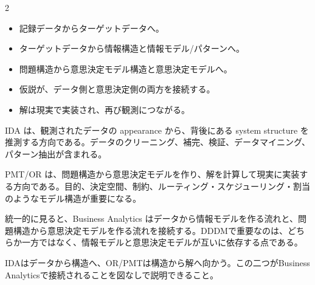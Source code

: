 \begin{multicols}{2}

\footnotesize

\raggedcolumns


\begin{itemize}
\item 記録データからターゲットデータへ。
\item ターゲットデータから情報構造と情報モデル/パターンへ。
\item 問題構造から意思決定モデル構造と意思決定モデルへ。
\item 仮説が、データ側と意思決定側の両方を接続する。
\item 解は現実で実装され、再び観測につながる。
\end{itemize}

IDA は、観測されたデータの appearance から、背後にある system structure を推測する方向である。データのクリーニング、補完、検証、データマイニング、パターン抽出が含まれる。\par

PMT/OR は、問題構造から意思決定モデルを作り、解を計算して現実に実装する方向である。目的、決定空間、制約、ルーティング・スケジューリング・割当のようなモデル構造が重要になる。\par

統一的に見ると、Business Analytics はデータから情報モデルを作る流れと、問題構造から意思決定モデルを作る流れを接続する。DDDMで重要なのは、どちらか一方ではなく、情報モデルと意思決定モデルが互いに依存する点である。\par

IDAはデータから構造へ、OR/PMTは構造から解へ向かう。この二つがBusiness Analyticsで接続されることを図なしで説明できること。\par


\end{multicols}
